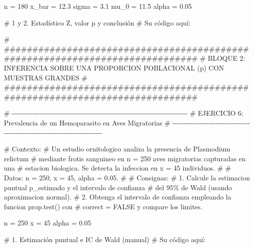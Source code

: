 \documentclass[
  spanish,
  letterpaper,
  DIV=11,
  numbers=noendperiod]{scrreprt}
\newenvironment{Shaded}{\begin{snugshade}}{\end{snugshade}}
\newcommand{\CommentTok}[1]{\textcolor[rgb]{0.37,0.37,0.37}{#1}}
\newcommand{\DecValTok}[1]{\textcolor[rgb]{0.68,0.00,0.00}{#1}}
\newcommand{\FloatTok}[1]{\textcolor[rgb]{0.68,0.00,0.00}{#1}}
\newcommand{\NormalTok}[1]{\textcolor[rgb]{0.00,0.23,0.31}{#1}}
\newcommand{\OtherTok}[1]{\textcolor[rgb]{0.00,0.23,0.31}{#1}}
\begin{document}
\begin{Shaded}
\begin{Highlighting}[]
\NormalTok{n }\OtherTok{=} \DecValTok{180}
\NormalTok{x\_bar }\OtherTok{=} \FloatTok{12.3}
\NormalTok{sigma }\OtherTok{=} \FloatTok{3.1}
\NormalTok{mu\_0 }\OtherTok{=} \FloatTok{11.5}
\NormalTok{alpha }\OtherTok{=} \FloatTok{0.05}

\CommentTok{\# 1 y 2. Estadístico Z, valor p y conclusión}
\CommentTok{\# Su código aquí:}



\CommentTok{\# \#\#\#\#\#\#\#\#\#\#\#\#\#\#\#\#\#\#\#\#\#\#\#\#\#\#\#\#\#\#\#\#\#\#\#\#\#\#\#\#\#\#\#\#\#\#\#\#\#\#\#\#\#\#\#\#\#\#\#\#\#\#\#\#\#\#\#\#\#\#\#\#\#\#\#\#\#}
\CommentTok{\# BLOQUE 2: INFERENCIA SOBRE UNA PROPORCION POBLACIONAL (p) CON MUESTRAS GRANDES}
\CommentTok{\# \#\#\#\#\#\#\#\#\#\#\#\#\#\#\#\#\#\#\#\#\#\#\#\#\#\#\#\#\#\#\#\#\#\#\#\#\#\#\#\#\#\#\#\#\#\#\#\#\#\#\#\#\#\#\#\#\#\#\#\#\#\#\#\#\#\#\#\#\#\#\#\#\#\#\#\#\#}

\CommentTok{\# {-}{-}{-}{-}{-}{-}{-}{-}{-}{-}{-}{-}{-}{-}{-}{-}{-}{-}{-}{-}{-}{-}{-}{-}{-}{-}{-}{-}{-}{-}{-}{-}{-}{-}{-}{-}{-}{-}{-}{-}{-}{-}{-}{-}{-}{-}{-}{-}{-}{-}{-}{-}{-}{-}{-}{-}{-}{-}{-}{-}{-}{-}{-}{-}{-}{-}{-}{-}{-}{-}{-}{-}{-}{-}{-}{-}{-}}
\CommentTok{\# EJERCICIO 6: Prevalencia de un Hemoparasito en Aves Migratorias}
\CommentTok{\# {-}{-}{-}{-}{-}{-}{-}{-}{-}{-}{-}{-}{-}{-}{-}{-}{-}{-}{-}{-}{-}{-}{-}{-}{-}{-}{-}{-}{-}{-}{-}{-}{-}{-}{-}{-}{-}{-}{-}{-}{-}{-}{-}{-}{-}{-}{-}{-}{-}{-}{-}{-}{-}{-}{-}{-}{-}{-}{-}{-}{-}{-}{-}{-}{-}{-}{-}{-}{-}{-}{-}{-}{-}{-}{-}{-}{-}}

\CommentTok{\# Contexto:}
\CommentTok{\# Un estudio ornitologico analiza la presencia de Plasmodium relictum}
\CommentTok{\# mediante frotis sanguineo en n = 250 aves migratorias capturadas en una}
\CommentTok{\# estacion biologica. Se detecta la infeccion en x = 45 individuos.}
\CommentTok{\#}
\CommentTok{\# Datos: n = 250, x = 45, alpha = 0.05.}
\CommentTok{\#}
\CommentTok{\# Consignas:}
\CommentTok{\# 1. Calcule la estimacion puntual p\_estimado y el intervalo de confianza}
\CommentTok{\#    del 95\% de Wald (usando aproximacion normal).}
\CommentTok{\# 2. Obtenga el intervalo de confianza empleando la funcion prop.test() con}
\CommentTok{\#    correct = FALSE y compare los limites.}

\NormalTok{n }\OtherTok{=} \DecValTok{250}
\NormalTok{x }\OtherTok{=} \DecValTok{45}
\NormalTok{alpha }\OtherTok{=} \FloatTok{0.05}

\CommentTok{\# 1. Estimación puntual e IC de Wald (manual)}
\CommentTok{\# Su código aquí:}




\end{Highlighting}
\end{Shaded}
\end{document}
